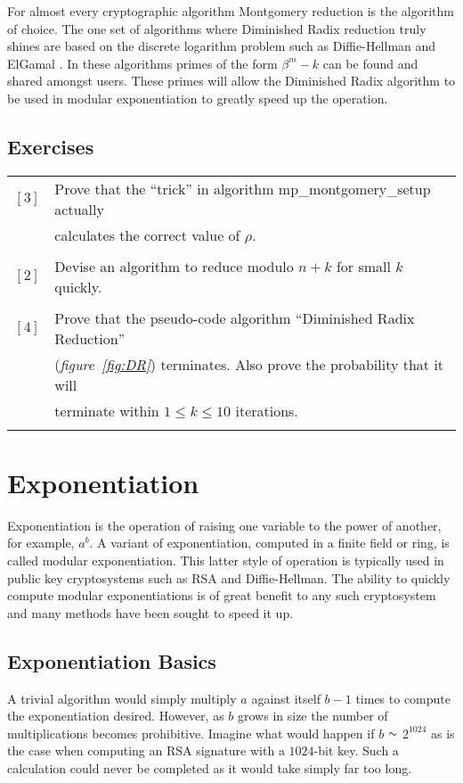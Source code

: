 \documentclass[b5paper]{book}
\def\approx{\raisebox{0.2ex}{\mbox{\small $\sim$}}}
\begin{document}
For almost every cryptographic algorithm Montgomery reduction is the algorithm of choice.  The one set of algorithms where Diminished Radix reduction truly
shines are based on the discrete logarithm problem such as Diffie-Hellman \cite{DH} and ElGamal \cite{ELGAMAL}.  In these algorithms
primes of the form $\beta^m - k$ can be found and shared amongst users.  These primes will allow the Diminished Radix algorithm to be used in
modular exponentiation to greatly speed up the operation.



\section*{Exercises}
\begin{tabular}{cl}
$\left [ 3 \right ]$ & Prove that the ``trick'' in algorithm mp\_montgomery\_setup actually \\
                     & calculates the correct value of $\rho$. \\
                     & \\
$\left [ 2 \right ]$ & Devise an algorithm to reduce modulo $n + k$ for small $k$ quickly.  \\
                     & \\
$\left [ 4 \right ]$ & Prove that the pseudo-code algorithm ``Diminished Radix Reduction'' \\
                     & (\textit{figure~\ref{fig:DR}}) terminates.  Also prove the probability that it will \\
                     & terminate within $1 \le k \le 10$ iterations. \\
                     & \\
\end{tabular}                     


\chapter{Exponentiation}
Exponentiation is the operation of raising one variable to the power of another, for example, $a^b$.  A variant of exponentiation, computed
in a finite field or ring, is called modular exponentiation.  This latter style of operation is typically used in public key 
cryptosystems such as RSA and Diffie-Hellman.  The ability to quickly compute modular exponentiations is of great benefit to any
such cryptosystem and many methods have been sought to speed it up.

\section{Exponentiation Basics}
A trivial algorithm would simply multiply $a$ against itself $b - 1$ times to compute the exponentiation desired.  However, as $b$ grows in size
the number of multiplications becomes prohibitive.  Imagine what would happen if $b$ $\approx$ $2^{1024}$ as is the case when computing an RSA signature
with a $1024$-bit key.  Such a calculation could never be completed as it would take simply far too long.
\end{document}
